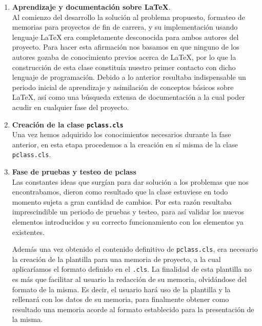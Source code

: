 	\begin{enumerate}
			\item \textbf{Aprendizaje y documentaci\'on sobre \LaTeX{}}.\\ 
						Al comienzo del desarrollo la soluci\'on al problema propuesto, formateo de memorias para proyectos de 
						fin de carrera, y su implementaci\'on usando lenguaje \LaTeX{} era completamente desconocida 
						para ambos autores del proyecto. Para hacer esta afirmaci\'on nos basamos en que ninguno de los autores 
						gozaba de conocimiento previos acerca de \LaTeX{}, por lo que la construcci\'on de esta clase constitu\'ia
						nuestro primer contacto con dicho lenguaje de programaci\'on. Debido a lo anterior resultaba indispensable
						un periodo inicial de aprendizaje y asimilaci\'on de conceptos b\'asicos sobre \LaTeX{}, as\'i como 
						una b\'usqueda extensa de documentaci\'on a la cual poder acudir en cualquier fase del proyecto.
						
			\item \textbf{Creaci\'on de la clase \texttt{pclass.cls}}\\
						Una vez hemos adquirido los conocimientos necesarios durante la fase anterior, en esta etapa procedemos
						a la creaci\'on en s\'i misma de la clase \texttt{pclass.cls}.
			
			\item \textbf{Fase de pruebas y testeo de \textbf{pclass}}\\
						Las constantes ideas que surg\'ian para dar soluci\'on a los problemas que nos encontrabamos, dieron como 
						resultado que la clase estuviese en todo momento sujeta a gran cantidad de cambios. Por esta raz\'on resultaba
						imprescindible un periodo de pruebas y testeo, para as\'i validar los nuevos elementos introducidos y
						su correcto funcionamiento con los elementos ya existentes.
						
						Adem\'as una vez obtenido el contenido definitivo de \texttt{pclass.cls}, era necesario la creaci\'on de 
						la plantilla para una memoria de proyecto, a la cual aplicar\'iamos el formato definido en el \texttt{.cls}. 
						La finalidad de esta plantilla no es m\'as que facilitar al usuario la redacci\'on de su memoria, olvid\'andose 
						del formato de la misma. Es decir, el usuario har\'a uso de la plantilla y la rellenar\'a con los datos de 
						su memoria, para finalmente obtener como resultado una memoria acorde al formato establecido para la 
						presentaci\'on de la misma.
						

\end{enumerate}
